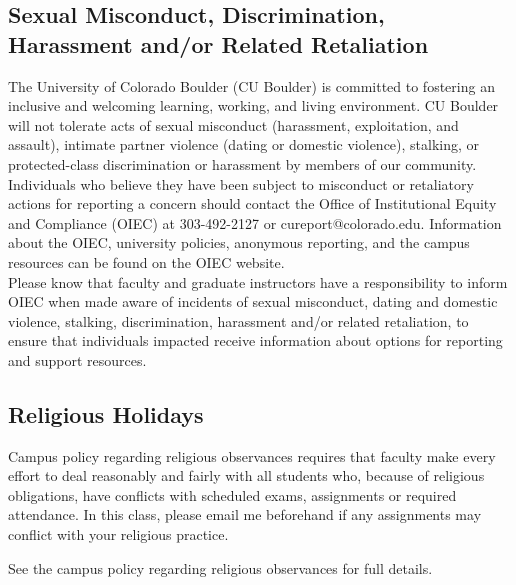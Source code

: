 \documentclass[9pt]{article}
\begin{document}
{\subsection*{Sexual Misconduct, Discrimination, Harassment and/or Related Retaliation}

The University of Colorado Boulder (CU Boulder) is committed to fostering an inclusive and welcoming learning, working, and living environment. CU Boulder will not tolerate acts of sexual misconduct (harassment, exploitation, and assault), intimate partner violence (dating or domestic violence), stalking, or protected-class discrimination or harassment by members of our community. Individuals who believe they have been subject to misconduct or retaliatory actions for reporting a concern should contact the Office of Institutional Equity and Compliance (OIEC) at 303-492-2127 or cureport@colorado.edu. Information about the OIEC, university policies, anonymous reporting, and the campus resources can be found on the OIEC website.\\

Please know that faculty and graduate instructors have a responsibility to inform OIEC when made aware of incidents of sexual misconduct, dating and domestic violence, stalking, discrimination, harassment and/or related retaliation, to ensure that individuals impacted receive information about options for reporting and support resources.

\subsection*{Religious Holidays}
Campus policy regarding religious observances requires that faculty make every effort to deal reasonably and fairly with all students who, because of religious obligations, have conflicts with scheduled exams, assignments or required attendance.  In this class, please email me beforehand if any assignments may conflict with your religious practice.

See the campus policy regarding religious observances for full details.

}
\end{document}
